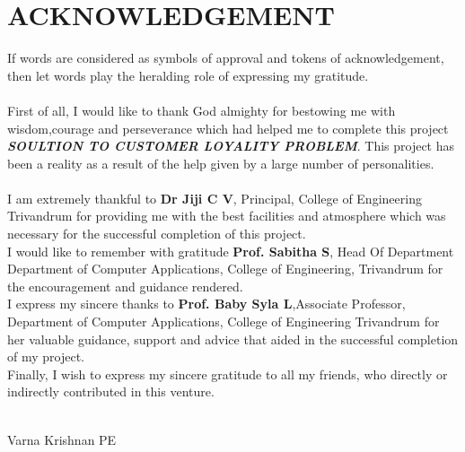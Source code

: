 \chapter*{\rm \large \bf ACKNOWLEDGEMENT}
\vspace{4.0mm}
\setlength{\parindent}{1cm} 


\indent If words are considered as symbols of approval and tokens of
acknowledgement, then let words play the heralding role of expressing my
gratitude.\\ \\
\indent First of all, I would like to thank God almighty for bestowing me with
wisdom,courage and perseverance which had helped me to complete this
project \textbf{\textit{SOULTION TO CUSTOMER LOYALITY PROBLEM}}.
This project has been a reality as a result of the help given by a large
number of personalities.\\ \\
\indent I am extremely thankful to \textbf{Dr Jiji C V}, Principal, College of Engineering Trivandrum for providing me with the best facilities and atmosphere which was necessary for the successful completion of this project.\\ 

\indent I would like to remember with gratitude \textbf{Prof. Sabitha S},
Head Of Department Department of Computer Applications, College of Engineering,
Trivandrum for the encouragement and guidance rendered.\\ 

\indent I express my sincere thanks to \textbf{Prof. Baby Syla L},Associate
Professor, Department of Computer Applications, College of Engineering
Trivandrum for her valuable guidance, support and advice that aided in the
successful completion of my project.\\ 

\indent Finally, I wish to express my sincere gratitude to all my friends,
who directly or indirectly contributed in this venture. \\ \\




\begin{flushright}
Varna Krishnan PE\\


\end{flushright}
\newpage
